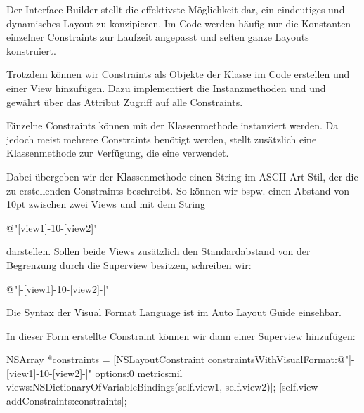 \documentclass[parskip=half, final]{scrreprt}
\begin{document}
Der Interface Builder stellt die effektivste Möglichkeit dar, ein eindeutiges und dynamisches Layout zu konzipieren. Im Code werden häufig nur die Konstanten einzelner Constraints zur Laufzeit angepasst und selten ganze Layouts konstruiert.

Trotzdem können wir Constraints als Objekte der  Klasse im Code erstellen und einer View hinzufügen. Dazu implementiert  die Instanzmethoden  und  und gewährt über das Attribut  Zugriff auf alle Constraints.

Einzelne Constraints können mit der Klassenmethode  instanziert werden. Da jedoch meist mehrere Constraints benötigt werden, stellt  zusätzlich eine Klassenmethode  zur Verfügung, die eine  verwendet.

Dabei übergeben wir der Klassenmethode einen String im ASCII-Art Stil, der die zu erstellenden Constraints beschreibt. So können wir bspw. einen Abstand von 10pt zwischen zwei Views  und  mit dem String
\begin{objclst}
@"[view1]-10-[view2]"
\end{objclst}
darstellen. Sollen beide Views zusätzlich den Standardabstand von der Begrenzung durch die Superview besitzen, schreiben wir:
\begin{objclst}
@"|-[view1]-10-[view2]-|"
\end{objclst}

Die Syntax der Visual Format Language ist im Auto Layout Guide einsehbar.

In dieser Form erstellte Constraint können wir dann einer Superview hinzufügen:
\begin{objclst}
NSArray *constraints = [NSLayoutConstraint constraintsWithVisualFormat:@"|-[view1]-10-[view2]-|" options:0 metrics:nil views:NSDictionaryOfVariableBindings(self.view1, self.view2)];
[self.view addConstraints:constraints];
\end{objclst}


%
%
\end{document}
